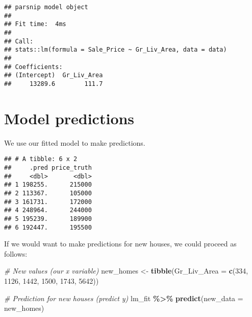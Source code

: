\documentclass[
]{book}
\newenvironment{Shaded}{\begin{snugshade}}{\end{snugshade}}
\newcommand{\CommentTok}[1]{\textcolor[rgb]{0.56,0.35,0.01}{\textit{#1}}}
\newcommand{\DataTypeTok}[1]{\textcolor[rgb]{0.13,0.29,0.53}{#1}}
\newcommand{\DecValTok}[1]{\textcolor[rgb]{0.00,0.00,0.81}{#1}}
\newcommand{\KeywordTok}[1]{\textcolor[rgb]{0.13,0.29,0.53}{\textbf{#1}}}
\newcommand{\NormalTok}[1]{#1}
\newcommand{\OperatorTok}[1]{\textcolor[rgb]{0.81,0.36,0.00}{\textbf{#1}}}
\newcommand{\StringTok}[1]{\textcolor[rgb]{0.31,0.60,0.02}{#1}}
\begin{document}
\begin{verbatim}
## parsnip model object
## 
## Fit time:  4ms 
## 
## Call:
## stats::lm(formula = Sale_Price ~ Gr_Liv_Area, data = data)
## 
## Coefficients:
## (Intercept)  Gr_Liv_Area  
##     13289.6        111.7
\end{verbatim}

\hypertarget{model-predictions}{%
\section{Model predictions}\label{model-predictions}}

We use our fitted model to make predictions.

\begin{Shaded}
\end{Shaded}

\begin{verbatim}
## # A tibble: 6 x 2
##     .pred price_truth
##     <dbl>       <dbl>
## 1 198255.      215000
## 2 113367.      105000
## 3 161731.      172000
## 4 248964.      244000
## 5 195239.      189900
## 6 192447.      195500
\end{verbatim}

If we would want to make predictions for new houses, we could proceed as follows:

\begin{Shaded}
\begin{Highlighting}[]
\CommentTok{\# New values (our x variable)}
\NormalTok{new\_homes \textless{}{-}}\StringTok{ }
\StringTok{  }\KeywordTok{tibble}\NormalTok{(}\DataTypeTok{Gr\_Liv\_Area =} \KeywordTok{c}\NormalTok{(}\DecValTok{334}\NormalTok{, }\DecValTok{1126}\NormalTok{, }\DecValTok{1442}\NormalTok{, }\DecValTok{1500}\NormalTok{, }\DecValTok{1743}\NormalTok{, }\DecValTok{5642}\NormalTok{)) }

\CommentTok{\# Prediction for new houses (predict y)}
\NormalTok{lm\_fit }\OperatorTok{\%\textgreater{}\%}
\StringTok{ }\KeywordTok{predict}\NormalTok{(}\DataTypeTok{new\_data =}\NormalTok{ new\_homes)}
\end{Highlighting}
\end{Shaded}
\end{document}
